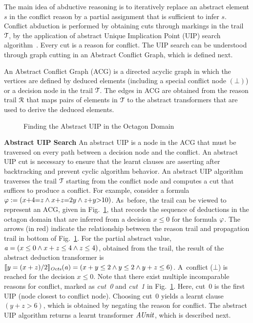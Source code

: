 The main idea of abductive  reasoning is to iteratively replace an abstract
element $s$ in the conflict reason by a partial assignment that is sufficient 
to infer $s$.  Conflict abduction is performed by obtaining cuts through markings 
in the trail $\mathcal{T}$, by the application of abstract Unique Implication Point (UIP) 
search algorithm~\cite{cdcl}.  Every cut is a reason for conflict.  The UIP
search can be understood through graph cutting in an Abstract Conflict
Graph, which is defined next. 
\begin{definition}
  An Abstract Conflict Graph (ACG) is a directed acyclic graph in
  which the vertices are defined by deduced elements (including a
  special conflict node $(\bot)$) or a decision node in the trail
  $\mathcal{T}$.  The edges in ACG are obtained from the reason trail
  $\mathcal{R}$ that maps pairs of elements in $\mathcal{T}$ to the abstract
  transformers that are used to derive the deduced elements.  
\end{definition}
%
\begin{figure}[t]
\centering
{}
\caption{\label{uip}Finding the Abstract UIP in the Octagon Domain}
\end{figure}  
%
\noindent \textbf{Abstract UIP Search}
An abstract UIP is a node in the ACG that must be traversed on every path between a 
decision node and the conflict. An abstract UIP cut is necessary to ensure that
the learnt clauses are asserting after backtracking and prevent cyclic algorithm
behavior. 
An abstract UIP algorithm~\cite{DBLP:journals/fmsd/BrainDGHK14} traverses
the trail $\mathcal{T}$ starting from the conflict node and computes a cut that
suffices to produce a conflict.  For example, consider a formula $\varphi:=
(x{+}4{=}z \wedge x{+}z{=}2y \wedge z{+}y{>}10)$.  As~before, the trail can be
viewed to represent an ACG, given in Fig.~\ref{uip}, that records the 
sequence of deductions in the octagon domain that are inferred
from a decision $x {\leq} 0$ for the formula $\varphi$.  The arrows (in
red) indicate the relationship between the reason trail and propagation trail
in bottom of Fig.~\ref{uip}.  For the partial abstract value,
$\mathit{a}=(x\leq0 \wedge x+z\leq4 \wedge z\leq4)$, obtained from the trail,
the result of the abstract deduction transformer is
$\llbracket y=(x+z)/2 \rrbracket_{\mathit{Octs}}(\mathit{a})=(x+y\leq2 \wedge y\leq2 \wedge y+z\leq6)$. 
A~conflict ($\bot$) is reached for the decision ${x{\leq}0}$.  Note that
there exist multiple incomparable reasons for conflict, marked as {\em cut~0}
and {\em cut~1} in Fig.~\ref{uip}.  Here, cut~0 is the first UIP (node closest
to conflict node).  Choosing cut~0 yields a learnt clause $(y+z>6)$, which is
obtained by negating the reason for conflict.  The abstract UIP algorithm
returns a learnt transformer $\mathit{AUnit}$, which is described next.\\
%

